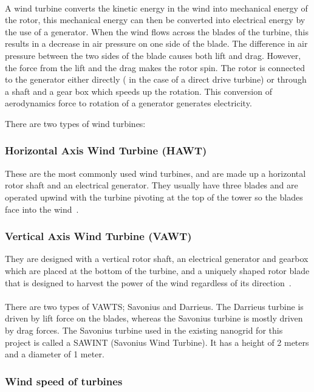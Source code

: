 \documentclass[titlepage]{article}
\begin{document}
\paragraph{}A wind turbine converts the kinetic energy in the wind into mechanical energy of the rotor, this mechanical energy can then be converted into electrical energy by the use of a generator. When the wind flows across the blades of the turbine, this results in a decrease in air pressure on one side of the blade. The difference in air pressure between the two sides of the blade causes both lift and drag. However, the force from the lift and the drag makes the rotor spin. The rotor is connected to the generator either directly ( in the case of a direct drive turbine) or through a shaft and a gear box which speeds up the rotation. This conversion of aerodynamics force to rotation of a generator generates electricity. 

There are two types of wind turbines:
\subsubsection{Horizontal Axis Wind Turbine (HAWT)}These are the most commonly used wind turbines, and are made up a horizontal rotor shaft and an electrical generator. They usually have three blades and are operated upwind with the turbine pivoting at the top of the tower so the blades face into the wind~\cite{Energy.govwebsite}.
\subsubsection{Vertical Axis Wind Turbine (VAWT)}They are designed with a vertical rotor shaft, an electrical generator and gearbox which are placed at the bottom of the turbine, and a uniquely shaped rotor blade that is designed to harvest the power of the wind regardless of its direction~\cite{T.AI-Shemmeri}.
\paragraph{}There are two types of VAWTS; Savonius and Darrieus. The Darrieus turbine is driven by lift force on the blades, whereas the Savonius turbine is mostly driven by drag forces. The Savonius turbine used in the existing nanogrid for this project is called a SAWINT (Savonius Wind Turbine). It has a height of 2 meters and a diameter of 1 meter. 
\subsubsection{Wind speed of turbines}
\end{document}
